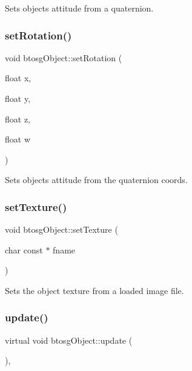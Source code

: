 Sets objects attitude from a quaternion. \mbox{\label{classbtosgObject_a4d21ca59b944fd26644db35d3e9ba67a}} 
\subsubsection{\texorpdfstring{set\+Rotation()}{setRotation()}\hspace{0.1cm}{\footnotesize\ttfamily [2/2]}}
{\footnotesize\ttfamily void btosg\+Object\+::set\+Rotation (\begin{DoxyParamCaption}\item[{float}]{x,  }\item[{float}]{y,  }\item[{float}]{z,  }\item[{float}]{w }\end{DoxyParamCaption})\hspace{0.3cm}{\ttfamily [inline]}}

Sets objects attitude from the quaternion coords. \mbox{\label{classbtosgObject_aff54acbc7c66811efb0cf2838107a241}} 
\subsubsection{\texorpdfstring{set\+Texture()}{setTexture()}}
{\footnotesize\ttfamily void btosg\+Object\+::set\+Texture (\begin{DoxyParamCaption}\item[{char const $\ast$}]{fname }\end{DoxyParamCaption})}

Sets the object texture from a loaded image file. \mbox{\label{classbtosgObject_a342917817dfde62554f83da8e0d5110b}} 
\subsubsection{\texorpdfstring{update()}{update()}}
{\footnotesize\ttfamily virtual void btosg\+Object\+::update (\begin{DoxyParamCaption}{ }\end{DoxyParamCaption})\hspace{0.3cm}{\ttfamily [inline]}, {\ttfamily [virtual]}}

